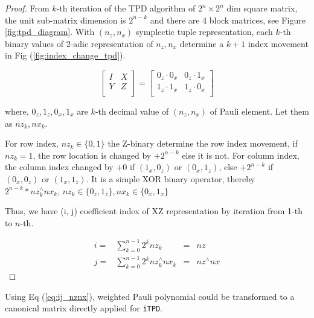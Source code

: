 \documentclass[twocolumn]{article}
\begin{document}
\begin{proof}
    From $k$-th iteration of the TPD algorithm of $2^n \times 2^n$ dim square matrix, 
    the unit sub-matrix dimension is $2^{n-k}$ and there are 4 block matrices, see Figure \ref{fig:tpd_diagram}.
    With $(n_z, n_x)$ symplectic tuple representation, 
    each $k$-th binary values of 2-adic representation of $n_z, n_x$ determine a $k+1$ index movement in Fig (\ref{fig:index_change_tpd}).

    \begin{equation}
        \begin{bmatrix}
            I& X\\
            Y & Z\\
        \end{bmatrix} = \begin{bmatrix}
            0_z \cdot 0_x & 0_z \cdot 1_x\\
            1_z \cdot 1_x & 1_z \cdot 0_x\\
        \end{bmatrix}
    \end{equation}
    
    where, $0_z, 1_z, 0_x, 1_x$ are $k$-th decimal value of $(n_z, n_x)$ of Pauli element.
    Let them as $nz_k, nx_k$.

    For row index, $nz_k\in \{0, 1\}$ the Z-binary determine
    the row index movement, if $nz_k = 1$, the row location is changed by $+2^{n-k}$ else it is not.
    For column index, the column index changed by $+0$ if $(1_x, 0_z)$ or $(0_x, 1_z)$, 
    else $+2^{n-k}$ if $(0_x, 0_z)$ or $(1_x, 1_z)$.
    It is a simple XOR binary operator, thereby 
    $2^{n-k} * nz_k^{\wedge}nx_k, \, nz_k\in \{0_z, 1_z\}, nx_k \in \{0_x, 1_x\}$

    Thus, we have (i, j) coefficient index of XZ representation by iteration from 1-th to $n$-th. 

    \begin{equation}
        \begin{array}{clcc}
        i =& \sum_{k=0}^{n-1} 2^{k} nz_k &=& nz\\
        j =& \sum_{k=0}^{n-1} 2^{k} nz_k^{\wedge} nx_k &=& nz^{\wedge}nx
        \end{array}
    \end{equation}

\end{proof}

Using Eq (\ref{eq:ij_nznx}), weighted Pauli polynomial could be transformed to 
a canonical matrix directly applied for \texttt{iTPD}.
\end{document}
